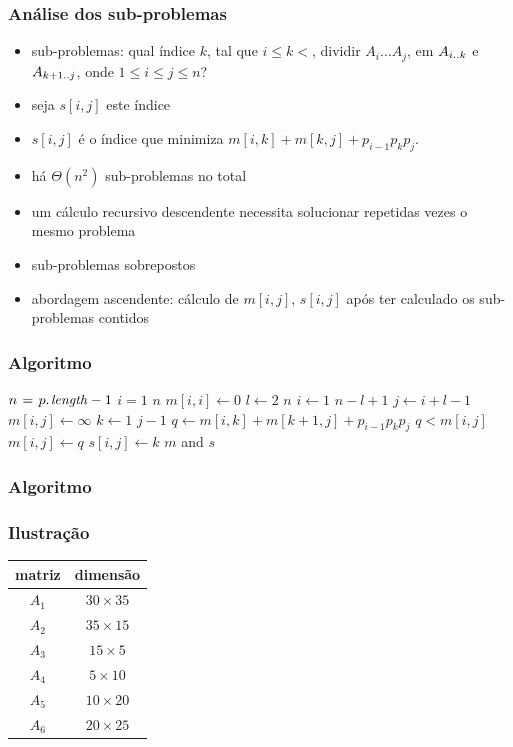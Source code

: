 \documentclass{beamer}
\begin{document}
\begin{frame}

\frametitle{Análise dos sub-problemas}

\begin{itemize}
\item sub-problemas: qual índice $k$, tal que $i \le k < $, dividir $A_i \ldots A_j$, em $A_{i \mathinner{\ldotp\ldotp} k}$ e $A_{k+1 \mathinner{\ldotp\ldotp} j}$, onde $1 \le i \le j \le n$?
\item seja $s[i, j]$ este índice
\item $s[i, j]$ é o índice que minimiza $m[i, k] + m[k, j] + p_{i-1}p_kp_j$.
\item há $\Theta(n^2)$ sub-problemas no total
\item um cálculo recursivo descendente necessita solucionar
repetidas vezes o mesmo problema
\item \alert{sub-problemas sobrepostos}
\item abordagem ascendente: cálculo de $m[i, j]$, $s[i, j]$ após ter
  calculado os sub-problemas contidos
\end{itemize}

\end{frame}

\begin{frame}

\frametitle{Algoritmo}

\begin{codebox}
\li $n \gets \attrib{p}{length} - 1$
\li \For $i = 1$ \To $n$
\li   \Do $m[i, i] \gets 0$
    \End
\li \For $l \gets 2$ \To $n$
\li \Do \For $i \gets 1$ \To $n-l+1$
\li   \Do $j \gets i+l-1$
\li     $m[i, j] \gets \infty$
\li     \For $k \gets 1$ \To $j-1$
\li     \Do $q \gets m[i, k]+m[k+1, j]+p_{i-1}p_kp_j$
\li       \If $q < m[i, j]$
\li       \Then $m[i, j] \gets q$
\li         $s[i, j] \gets k$
          \End
        \End
      \End
    \End
\li \Return $m$ and $s$
\end{codebox}

\end{frame}

\begin{frame}

\frametitle{Algoritmo}
\frametitle{Ilustração}

\begin{tabular}{c|c}
matriz & dimensão \\
\hline
$A_1$ & $ 30 \times 35$ \\
$A_2$ & $ 35 \times 15$ \\
$A_3$ & $ 15 \times 5$ \\
$A_4$ & $ 5 \times 10$ \\
$A_5$ & $ 10 \times 20$ \\
$A_6$ & $ 20 \times 25$
\end{tabular}

\end{frame}
\end{document}
